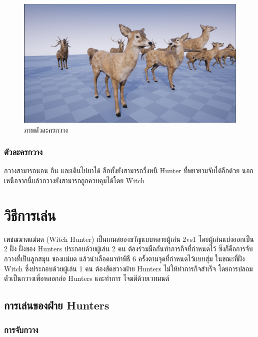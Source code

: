\begin{figure}[p]
  \begin{center}
  \includegraphics[width=\textwidth]{./img/characters/deerdoe.png}
  \end{center}
  \caption[ภาพตัวละครกวาง]{ภาพตัวละครกวาง}
  \label{ภาพตัวละครกวาง}
\end{figure}

\subsubsection{ตัวละครกวาง}

กวางสามารถนอน กิน และเดินไปมาได้ อีกทั้งยังสามารถวิ่งหนี Hunter ที่พยายามจับได้อีกด้วย นอกเหนือจากนี้แล้วกวางยังสามารถถูกควบคุมได้โดย Witch

\section{วิธีการเล่น}

เพชฌฆาตแม่มด (Witch Hunter) เป็นเกมสยองขวัญแบบหลายผู้เล่น 2vs1 โดยผู้เล่นแบ่งออกเป็น 2 ฝั่ง 
ฝั่งของ Hunters ประกอบด้วยผู้เล่น 2 คน ต้องร่วมมือกันทำภารกิจที่กำหนดไว้ ซึ่งก็คือการจับกวางที่เป็นลูกสมุน
ของแม่มด แล้วนำเลือดมาทำพิธี 6 ครั้งตามจุดที่กำหนดไว้แบบสุ่ม ในขณะที่ฝั่ง Witch ซึ่งประกอบด้วยผู้เล่น 1 คน
ต้องขัดขวางฝ่าย Hunters ไม่ให้ทำภารกิจสำเร็จ โดยการปลอมตัวเป็นกวางเพื่อหลอกล่อ Hunters และทำการ
โจมตีด้วยเวทมนต์

\subsection{การเล่นของฝ่าย Hunters}

\subsubsection{การจับกวาง}

